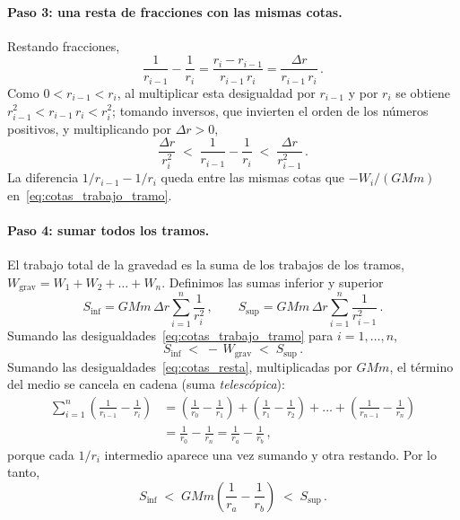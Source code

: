 \paragraph{Paso 3: una resta de fracciones con las mismas cotas.}
Restando fracciones,
\begin{equation}
  \frac{1}{r_{i-1}} - \frac{1}{r_{i}}
  = \frac{r_{i} - r_{i-1}}{r_{i-1}\,r_{i}}
  = \frac{\Delta r}{r_{i-1}\,r_{i}} \,.
  \label{eq:resta_fracciones}
\end{equation}
Como $0 < r_{i-1} < r_{i}$, al multiplicar esta desigualdad por $r_{i-1}$ y
por $r_{i}$ se obtiene $r_{i-1}^{2} < r_{i-1}\,r_{i} < r_{i}^{2}$; tomando
inversos, que invierten el orden de los números positivos, y multiplicando
por $\Delta r > 0$,
\begin{equation}
  \frac{\Delta r}{r_{i}^{2}}
  \;<\; \frac{1}{r_{i-1}} - \frac{1}{r_{i}} \;<\;
  \frac{\Delta r}{r_{i-1}^{2}} \,.
  \label{eq:cotas_resta}
\end{equation}
La diferencia $1/r_{i-1} - 1/r_{i}$ queda entre las mismas cotas que
$-W_{i}/(GMm)$ en~\eqref{eq:cotas_trabajo_tramo}.

\paragraph{Paso 4: sumar todos los tramos.}
El trabajo total de la gravedad es la suma de los trabajos de los tramos,
$W_{\text{grav}} = W_{1} + W_{2} + \dots + W_{n}$. Definimos las sumas
inferior y superior
\begin{equation}
  S_{\text{inf}} = GMm\,\Delta r \sum_{i=1}^{n} \frac{1}{r_{i}^{2}} \,,
  \qquad
  S_{\text{sup}} = GMm\,\Delta r \sum_{i=1}^{n} \frac{1}{r_{i-1}^{2}} \,.
  \label{eq:sumas_inf_sup}
\end{equation}
Sumando las desigualdades~\eqref{eq:cotas_trabajo_tramo} para
$i = 1, \dots, n$,
\begin{equation}
  S_{\text{inf}} \;<\; -\,W_{\text{grav}} \;<\; S_{\text{sup}} \,.
  \label{eq:cotas_trabajo_total}
\end{equation}
Sumando las desigualdades~\eqref{eq:cotas_resta}, multiplicadas por $GMm$,
el término del medio se cancela en cadena (suma \emph{telescópica}):
\begin{align}
  \sum_{i=1}^{n}\left(\frac{1}{r_{i-1}} - \frac{1}{r_{i}}\right)
  &= \left(\frac{1}{r_{0}} - \frac{1}{r_{1}}\right)
   + \left(\frac{1}{r_{1}} - \frac{1}{r_{2}}\right)
   + \dots
   + \left(\frac{1}{r_{n-1}} - \frac{1}{r_{n}}\right) \nonumber\\
  &= \frac{1}{r_{0}} - \frac{1}{r_{n}}
   = \frac{1}{r_{a}} - \frac{1}{r_{b}} \,,
  \label{eq:suma_telescopica}
\end{align}
porque cada $1/r_{i}$ intermedio aparece una vez sumando y otra restando. Por
lo tanto,
\begin{equation}
  S_{\text{inf}} \;<\; GMm\left(\frac{1}{r_{a}} - \frac{1}{r_{b}}\right)
  \;<\; S_{\text{sup}} \,.
  \label{eq:cotas_valor_exacto}
\end{equation}

